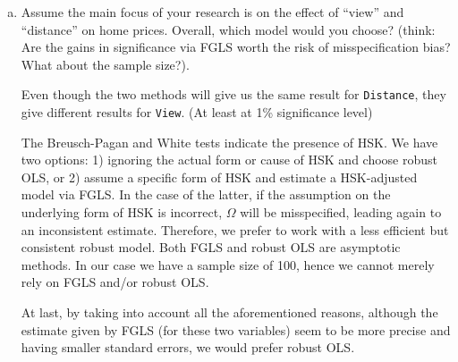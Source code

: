 \documentclass[11pt,reqno]{amsart}\usepackage[]{graphicx}\usepackage[]{color}
\newcommand{\ksp}{\vspace{0.1in}}   %
\begin{document}
\begin{enumerate}[(a)]
\begin{enumerate}[(a)]
\ksp
\item Assume the main focus of your research is on the effect of “view” and “distance” on home prices.  Overall, which model would you choose? (think: Are the gains in significance via FGLS worth the risk of misspecification bias? What about the sample size?).

\ksp
Even though the two methods will give us the same result for \texttt{Distance}, they give different results for \texttt{View}. (At least at 1\% significance level)

The Breusch-Pagan and White tests indicate the presence of HSK. We have two options: 1) ignoring the actual form or cause of HSK and choose robust OLS, or 2) assume a specific form of HSK and estimate a HSK-adjusted model via FGLS. In the case of the latter, if the assumption on the underlying form of HSK is incorrect, $\Omega$ will be misspecified, leading again to an inconsistent estimate. Therefore, we prefer to work with a less efficient but consistent robust model. Both FGLS and robust OLS are asymptotic methods. In our case we have a sample size of 100, hence we cannot merely rely on FGLS and/or robust OLS. 

At last, by taking into account all the aforementioned reasons, although the estimate given by FGLS (for these two variables) seem to be more precise and having smaller standard errors, we would prefer robust OLS.
\end{enumerate}

\end{enumerate}
\end{document}
